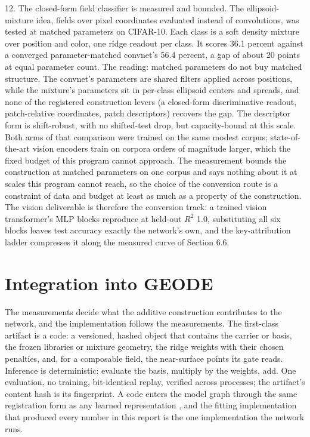 \documentclass[11pt]{article}
\begin{document}
12. The closed-form field classifier is measured and bounded.
    The ellipsoid-mixture idea, fields over pixel coordinates
    evaluated instead of convolutions, was tested at matched
    parameters on CIFAR-10. Each class is a soft density mixture
    over position and color, one ridge readout per class. It
    scores 36.1 percent against a converged parameter-matched
    convnet's 56.4 percent, a gap of about 20 points at equal
    parameter count. The reading: matched parameters do not buy
    matched structure. The convnet's parameters are shared
    filters applied across positions, while the mixture's
    parameters sit in per-class ellipsoid centers and spreads,
    and none of the registered construction levers (a closed-form
    discriminative readout, patch-relative coordinates, patch
    descriptors) recovers the gap. The descriptor form is
    shift-robust, with no shifted-test drop, but capacity-bound
    at this scale. Both arms of that comparison were trained on
    the same modest corpus; state-of-the-art vision encoders
    train on corpora orders of magnitude larger, which the fixed
    budget of this program cannot approach. The measurement
    bounds the construction at matched parameters on one corpus
    and says nothing about it at scales this program cannot
    reach, so the choice of the conversion route is a constraint
    of data and budget at least as much as a property of the
    construction. The vision deliverable is therefore the
    conversion track: a trained vision transformer's MLP blocks
    reproduce at held-out $R^2$ 1.0, substituting all six
    blocks leaves test accuracy exactly the network's own, and
    the key-attribution ladder compresses it along the measured
    curve of Section 6.6.

\section{Integration into GEODE}

The measurements decide what the additive construction contributes
to the network, and the implementation follows the measurements.
The first-class artifact is a code: a versioned, hashed object that
contains the carrier or basis, the frozen libraries or mixture
geometry, the ridge weights with their chosen penalties, and, for a
composable field, the near-surface points its gate reads.
Inference is deterministic: evaluate the basis, multiply by the
weights, add. One evaluation, no training, bit-identical replay,
verified across processes; the artifact's content hash is its
fingerprint. A code enters the model graph through the same
registration form as any learned representation \cite{whitepaper},
and the fitting implementation that produced every number in this
report is the one implementation the network runs.
\end{document}
